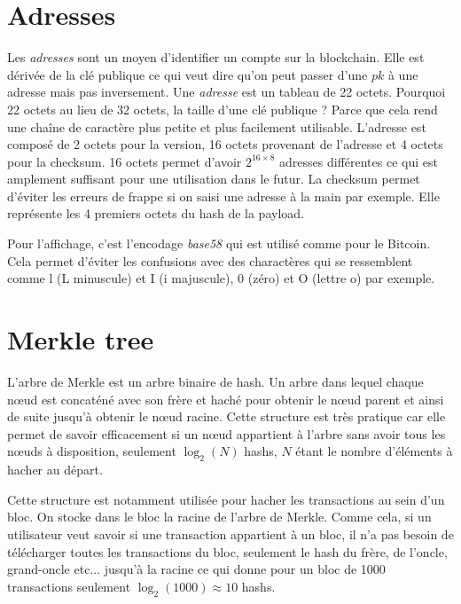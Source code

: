 \section{Adresses}

Les \emph{adresses} sont un moyen d'identifier un compte sur la blockchain. Elle est dérivée de la clé publique ce qui veut dire qu'on peut passer d'une $pk$ à une adresse mais pas inversement. Une \emph{adresse} est un tableau de 22 octets. Pourquoi 22 octets au lieu de 32 octets, la taille d'une clé publique ? Parce que cela rend une chaîne de caractère plus petite et plus facilement utilisable. L'adresse est composé de 2 octets pour la version, 16 octets provenant de l'adresse et 4 octets pour la checksum. 16 octets permet d'avoir $2^{16 \times 8}$ adresses différentes ce qui est amplement suffisant pour une utilisation dans le futur. La checksum permet d'éviter les erreurs de frappe si on saisi une adresse à la main par exemple. Elle représente les 4 premiers octets du hash de la payload.


Pour l'affichage, c'est l'encodage \emph{base58} qui est utilisé comme pour le Bitcoin. Cela permet d'éviter les confusions avec des charactères qui se ressemblent comme l (L minuscule) et I (i majuscule), 0 (zéro) et O (lettre o) par exemple.

\section{Merkle tree}

L'arbre de Merkle est un arbre binaire de hash. Un arbre dans lequel chaque nœud est concaténé avec son frère et haché pour obtenir le nœud parent et ainsi de suite jusqu'à obtenir le nœud racine. Cette structure est très pratique car elle permet de savoir efficacement si un nœud appartient à l'arbre sans avoir tous les nœuds à disposition, seulement $\log_2(N)$ hashs, $N$ étant le nombre d'éléments à hacher au départ.

Cette structure est notamment utilisée pour hacher les transactions au sein d'un bloc. On stocke dans le bloc la racine de l'arbre de Merkle. Comme cela, si un utilisateur veut savoir si une transaction appartient à un bloc, il n'a pas besoin de télécharger toutes les transactions du bloc, seulement le hash du frère, de l'oncle, grand-oncle etc... jusqu'à la racine ce qui donne pour un bloc de 1000 transactions seulement $\log_2(1000) \approx 10$ hashs.

